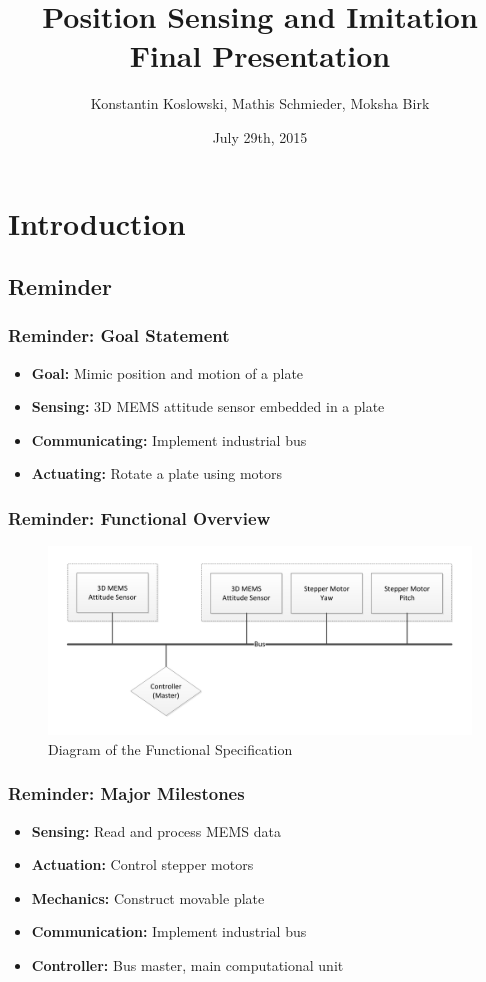 \documentclass{beamer}
\title[NES Project: Final Presentation]{Position Sensing and Imitation\\Final Presentation}
\author[Koslowski, Schmieder, Birk]{Konstantin Koslowski, Mathis Schmieder, Moksha Birk}
\institute[]
{TU Berlin \\
 Department of Telecommunication Systems \\
 Telecommunication Networks Group \\
}
\date{July 29th, 2015}
\begin{document}
\begin{frame}
  \titlepage
\end{frame}

\section{Introduction}
\subsection{Reminder}

\begin{frame}
  \frametitle{Reminder: Goal Statement}
  \begin{itemize}
    \item \textbf{Goal:} Mimic position and motion of a plate
    \vfill
    \item \textbf{Sensing:} 3D MEMS attitude sensor embedded in a plate
    \item \textbf{Communicating:} Implement industrial bus
    \item \textbf{Actuating:} Rotate a plate using motors
  \end{itemize}
\end{frame}

\begin{frame}
  \frametitle{Reminder: Functional Overview}
\begin{figure}
\includegraphics[width=\textwidth]{functionalspecification.pdf}
\caption{Diagram of the Functional Specification}
\end{figure}
\end{frame}

\begin{frame}
  \frametitle{Reminder: Major Milestones}
  \begin{itemize}
    \item \textbf{Sensing:} Read and process MEMS data\\
    \item \textbf{Actuation:} Control stepper motors\\
    \item \textbf{Mechanics:} Construct movable plate\\
    \item \textbf{Communication:} Implement industrial bus\\
    \item \textbf{Controller:} Bus master, main computational unit\\
  \end{itemize}
\end{frame}
\end{document}
